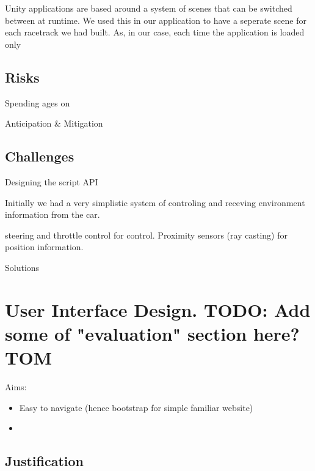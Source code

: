 Unity applications are based around a system of scenes that can be switched between at runtime. We used this in our application to have a seperate scene for each racetrack we had built. As, in our case, each time the application is loaded only 

\subsection{Risks}
Spending ages on 

Anticipation \& Mitigation

\subsection{Challenges}
Designing the script API

Initially we had a very simplistic system of controling and receving environment information from the car. 

steering and throttle control for control. Proximity sensors (ray casting) for position information. 

Solutions

\section{User Interface Design. TODO: Add some of "evaluation" section here? {\color{red} TOM}}
Aims:
\begin{itemize}
\item Easy to navigate (hence bootstrap for simple familiar website) 
\item 
\end{itemize}



\subsection{Justification}



